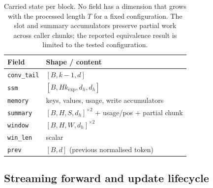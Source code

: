 \begin{table}[t]
\centering
\caption{Carried state per block. No field has a dimension that grows with the processed length
$T$ for a fixed configuration. The slot and summary accumulators preserve partial work across
caller chunks; the reported equivalence result is limited to the tested configuration.}
\label{tab:state}
\small
\begin{tabular}{@{}l l@{}}
\toprule
Field & Shape / content \\
\midrule
\texttt{conv\_tail} & $[B,k-1,d]$ \\
\texttt{ssm} & $[B,Hk_{\mathrm{exp}},d_h,d_h]$ \\
\texttt{memory} & keys, values, usage, write accumulators \\
\texttt{summary} & $[B,H,S,d_h]^{\times 2}$ + usage/pos + partial chunk \\
\texttt{window} & $[B,H,W,d_h]^{\times 2}$ \\
\texttt{win\_len} & scalar \\
\texttt{prev} & $[B,d]$ (previous normalised token) \\
\bottomrule
\end{tabular}
\end{table}

\subsection{Streaming forward and update lifecycle}
\label{sec:algorithm}

